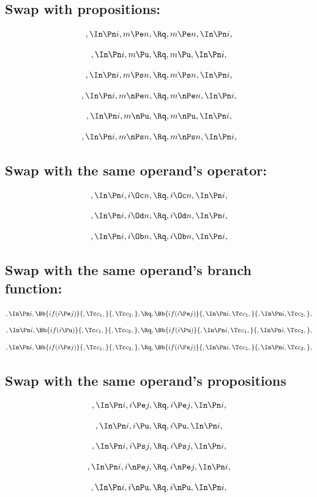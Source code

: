 \bigskip
\bigskip
\subsection{Swap with propositions:}
\[,\In \Pn i, m \Pe n, \Rq , m \Pe n, \In \Pn i,\]

\[,\In \Pn i, m \Pu, \Rq , m \Pu, \In \Pn i,\]

\[,\In \Pn i, m \Ps n, \Rq , m \Ps n, \In \Pn i,\]

\[,\In \Pn i, m \nPe n, \Rq , m \nPe n, \In \Pn i,\]

\[,\In \Pn i, m \nPu, \Rq , m \nPu, \In \Pn i,\]

\[,\In \Pn i, m \nPs n, \Rq , m \nPs n, \In \Pn i,\]


\bigskip
\bigskip
\subsection{Swap with the same operand's operator:}
\[,\In \Pn i, i \Oc n, \Rq , i \Oc n, \In \Pn i,\]

\[,\In \Pn i, i \Od n, \Rq , i \Od n, \In \Pn i,\]

\[,\In \Pn i, i \Ob n, \Rq , i \Ob n, \In \Pn i,\]

\bigskip
\bigskip
\subsection{Swap with the same operand's  branch function:}
\[,\In \Pn i, \Bb{if(i \Pe j)}{,\Tc c_1,}{,\Tc c_2,}, \Rq , \Bb{if(i \Pe j)}{,\In \Pn i, \Tc c_1,}{,\In \Pn i, \Tc c_2,},\]
\bigskip
\bigskip
\[,\In \Pn i, \Bb{if(i \Pu)}{,\Tc c_1,}{,\Tc c_2,}, \Rq , \Bb{if(i \Pu)}{,\In \Pn i, \Tc c_1,}{,\In \Pn i, \Tc c_2,},\]
\bigskip
\bigskip
\[,\In \Pn i, \Bb{if(i \Ps j)}{,\Tc c_1,}{,\Tc c_2,}, \Rq , \Bb{if(i \Ps j)}{,\In \Pn i, \Tc c_1,}{,\In \Pn i, \Tc c_2,},\]


\bigskip
\bigskip
\subsection{Swap with the same operand's propositions}
\[,\In \Pn i, i \Pe j, \Rq , i \Pe j, \In \Pn i,\]

\[,\In \Pn i, i \Pu, \Rq , i \Pu, \In \Pn i,\]

\[,\In \Pn i, i \Ps j, \Rq , i \Ps j, \In \Pn i,\]

\[,\In \Pn i, i \nPe j, \Rq , i \nPe j, \In \Pn i,\]

\[,\In \Pn i, i \nPu, \Rq , i \nPu, \In \Pn i,\]

